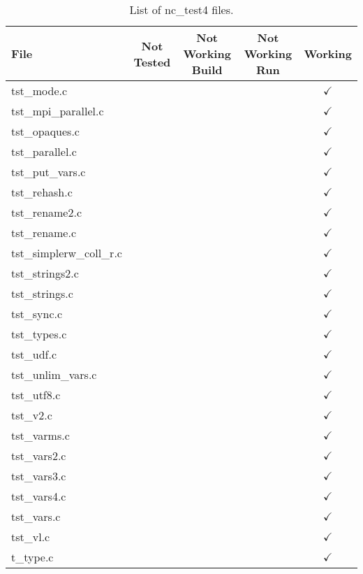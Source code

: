 \begin{table}[H]
\centering
\begin{tabular}{|l|c|c|c|c|}
\hline
File & Not Tested & Not Working Build & Not Working Run & Working \\ \hline \hline
tst\_mode.c   &  &   &   & $\checkmark$    \\ \hline
tst\_mpi\_parallel.c   &  &   &   & $\checkmark$    \\ \hline
tst\_opaques.c   &  &   &   & $\checkmark$    \\ \hline
tst\_parallel.c   &  &   &   & $\checkmark$    \\ \hline
tst\_put\_vars.c   &  &   &   & $\checkmark$    \\ \hline
tst\_rehash.c   &  &   &   & $\checkmark$    \\ \hline
tst\_rename2.c   &  &   &   & $\checkmark$    \\ \hline
tst\_rename.c   &  &   &   & $\checkmark$    \\ \hline
tst\_simplerw\_coll\_r.c   &  &   &   & $\checkmark$    \\ \hline
tst\_strings2.c   &  &   &   & $\checkmark$    \\ \hline
tst\_strings.c   &  &   &   & $\checkmark$    \\ \hline
tst\_sync.c   &  &   &   & $\checkmark$    \\ \hline
tst\_types.c   &  &   &   & $\checkmark$    \\ \hline
tst\_udf.c   &  &   &   & $\checkmark$    \\ \hline
tst\_unlim\_vars.c   &  &   &   & $\checkmark$    \\ \hline
tst\_utf8.c   &  &   &   & $\checkmark$    \\ \hline
tst\_v2.c   &  &   &   & $\checkmark$    \\ \hline
tst\_varms.c   &  &   &   & $\checkmark$    \\ \hline
tst\_vars2.c   &  &   &   & $\checkmark$    \\ \hline
tst\_vars3.c   &  &   &   & $\checkmark$    \\ \hline
tst\_vars4.c   &  &   &   & $\checkmark$    \\ \hline
tst\_vars.c   &  &   &   & $\checkmark$    \\ \hline
tst\_vl.c   &  &   &   & $\checkmark$    \\ \hline
t\_type.c   &  &   &   & $\checkmark$    \\ \hline
\end{tabular}
\caption{List of nc\_test4 files.}
\end{table}

